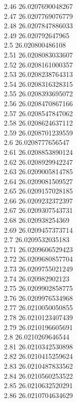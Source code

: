 {2.46	26.0207690048267\\
2.47	26.0207769076779\\
2.48	26.0207847886033\\
2.49	26.020792647965\\
2.5	26.020800486108\\
2.51	26.0208083033607\\
2.52	26.0208161000357\\
2.53	26.0208238764313\\
2.54	26.0208316328315\\
2.55	26.0208393695072\\
2.56	26.0208470867166\\
2.57	26.0208547847062\\
2.58	26.0208624637112\\
2.59	26.0208701239559\\
2.6	26.0208777656547\\
2.61	26.0208853890124\\
2.62	26.0208929942247\\
2.63	26.0209005814785\\
2.64	26.0209081509527\\
2.65	26.0209157028185\\
2.66	26.0209232372397\\
2.67	26.0209307543731\\
2.68	26.020938254369\\
2.69	26.0209457373714\\
2.7	26.0209532035183\\
2.71	26.0209606529423\\
2.72	26.0209680857704\\
2.73	26.0209755021249\\
2.74	26.020982902123\\
2.75	26.0209902858775\\
2.76	26.0209976534968\\
2.77	26.0210050050855\\
2.78	26.0210123407439\\
2.79	26.0210196605691\\
2.8	26.0210269646544\\
2.81	26.0210342530898\\
2.82	26.0210415259624\\
2.83	26.0210487833562\\
2.84	26.0210560253522\\
2.85	26.0210632520291\\
2.86	26.0210704634629\\
}
